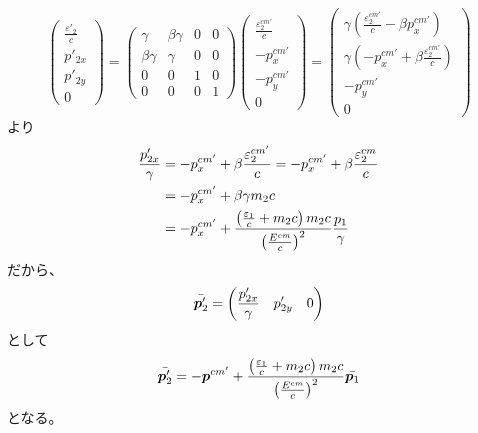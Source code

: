 \documentclass[a4paper,11pt,dvipdfmx]{jsarticle}
\begin{document}
\begin{equation}
    \left(
    \begin{array}{c}
     \frac{\varepsilon'_{2}}{c}  \\
      p'_{2x}\\
      p'_{2y} \\
      0
    \end{array}
  \right)  = \left(
    \begin{array}{cccc}
      \gamma & \beta\gamma & 0 & 0 \\
      \beta\gamma & \gamma & 0 & 0 \\
      0 & 0 & 1 & 0 \\
      0 & 0 & 0 & 1
    \end{array}
    \right) 
      \left(
    \begin{array}{c}
     \frac{\varepsilon^{cm'}_{2}}{c}  \\
      -p^{cm'}_{x}\\
      -p^{cm'}_{y}\\
      0
    \end{array}
  \right) =
    \left(
    \begin{array}{c}
     \gamma\left(\frac{\varepsilon^{cm'}_{2}}{c} -\beta p^{cm'}_{x}\right)  \\
      \gamma\left(-p^{cm'}_{x}+\beta\frac{\varepsilon^{cm'}_{2}}{c}\right)\\
      -p^{cm'}_{y}\\
      0
    \end{array}
  \right) 
\end{equation}
より
\begin{align}
    \frac{p'_{2x}}{\gamma} &= -p^{cm'}_{x}+ \beta\frac{\varepsilon^{cm'}_{2}}{c} = -p^{cm'}_{x}+ \beta\frac{\varepsilon^{cm}_{2}}{c} \notag\\
    &= -p^{cm'}_{x} + \beta\gamma m_{2}c \notag\\
    &= -p^{cm'}_{x} +\frac{\left(\frac{\varepsilon_{1}}{c}+m_{2}c\right)m_{2}c}{\left(\frac{E^{cm}}{c}\right)^2}\frac{p_{1}}{\gamma} 
\end{align}
だから、
\begin{equation*}
    \Bar{\bm{p}'_{2}} = \left(\frac{p'_{2x}}{\gamma} \quad p'_{2y} \quad 0\right)
\end{equation*}
として
\begin{equation}
     \Bar{\bm{p}'_{2}} = -\bm{p}^{cm'} +\frac{\left(\frac{\varepsilon_{1}}{c}+m_{2}c\right)m_{2}c}{\left(\frac{E^{cm}}{c}\right)^2}\Bar{\bm{p}_{1}}\label{eq:p2}
\end{equation}
となる。
\end{document}
